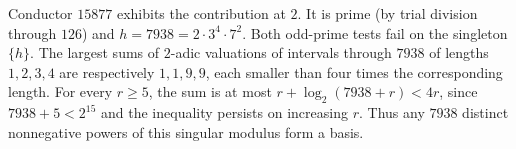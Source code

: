 Conductor $15877$ exhibits the contribution at $2$. It is prime
(by trial division through $126$) and $h=7938=2\cdot 3^4\cdot7^2$.
Both odd-prime tests fail on the singleton $\{h\}$. The largest
sums of $2$-adic valuations of intervals through $7938$ of lengths
$1,2,3,4$ are respectively $1,1,9,9$, each smaller than four times
the corresponding length. For every $r\ge5$, the sum is at most
$r+\log_2(7938+r)<4r$, since $7938+5<2^{15}$ and the inequality
persists on increasing $r$. Thus any $7938$ distinct nonnegative
powers of this singular modulus form a basis.
